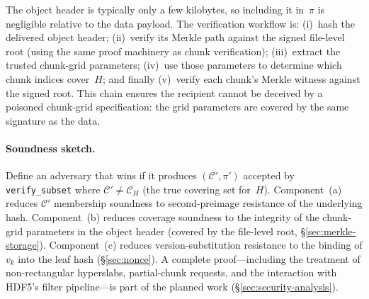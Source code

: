 \documentclass[11pt]{article}
\begin{document}
The object header is typically only a few kilobytes, so including it in~$\pi$
is negligible relative to the data payload. The verification workflow is:
(i)~hash the delivered object header; (ii)~verify its Merkle path against
the signed file-level root (using the same proof machinery as chunk
verification); (iii)~extract the trusted chunk-grid parameters; (iv)~use
those parameters to determine which chunk indices cover~$H$; and finally
(v)~verify each chunk's Merkle witness against the signed root. This chain
ensures the recipient cannot be deceived by a poisoned chunk-grid
specification: the grid parameters are covered by the same signature as
the data.

\paragraph{Soundness sketch.}
Define an adversary that wins if it produces $(\mathcal{C}', \pi')$ accepted
by \texttt{verify\_subset} where $\mathcal{C}' \neq \mathcal{C}_H$ (the true
covering set for~$H$). Component~(a) reduces $\mathcal{C}'$ membership soundness
to second-preimage resistance of the underlying hash. Component~(b) reduces
coverage soundness to the integrity of the chunk-grid parameters in the object
header (covered by the file-level root, \S\ref{sec:merkle-storage}).
Component~(c) reduces version-substitution resistance to the binding of $v_k$
into the leaf hash (\S\ref{sec:nonce}). A complete proof---including the
treatment of non-rectangular hyperslabs, partial-chunk requests, and the
interaction with HDF5's filter pipeline---is part of the planned work
(\S\ref{sec:security-analysis}).
\end{document}
